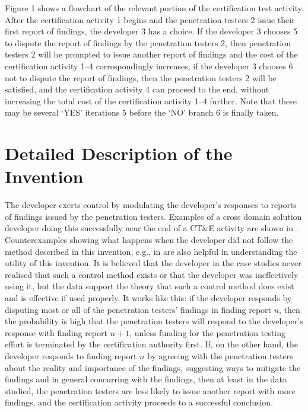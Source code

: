 \documentclass[12pt,letterpaper]{article}
\begin{document}
Figure 1 shows a flowchart of the relevant portion of the certification test activity.  After
the certification activity 1 begins and the penetration testers 2 issue their first report of
findings, the developer 3 has a choice.  If the developer 3 chooses 5 to dispute the report of
findings by the penetration testers 2, then penetration testers 2 will be prompted to issue
another report of findings and the cost of the certification activity 1--4 correspondingly
increases; if the developer 3 chooses 6 not to dispute the report of findings, then the
penetration testers 2 will be satisfied, and the certification activity 4 can proceed to the
end, without increasing the total cost of the certification activity 1--4 further.  Note that
there may be several `YES' iterations 5 before the `NO' branch 6 is finally taken.

\section{Detailed Description of the Invention}

The developer exerts control by modulating the developer's responses to reports of findings
issued by the penetration testers.  Examples of a cross domain solution developer doing
this successfully near the end of a CT\&E activity are shown in \cite[Chapter 4]{Loughry2012b}.
Counterexamples showing what happens when the developer did not follow the method described
in this invention, e.g., in \cite[Chapter 5]{Loughry2012b} are also helpful in understanding
the utility of this invention.  It is believed that the developer in the case studies never
realised that such a control method exists or that the developer was
ineffectively using it, but the data support the theory that such a control method does exist
and is effective if used properly.  It works like this: if the developer responds by disputing
most or all of the penetration testers' findings in finding report $n$, then the probability
is high that the penetration testers will respond to the developer's response with finding
report $n+1$, unless funding for the penetration testing effort is terminated by the
certification authority first.  If, on the other hand, the developer responds to finding
report $n$ by agreeing with the penetration testers about the reality and importance of the
findings, suggesting ways to mitigate the findings and in general concurring with the findings,
then at least in the data studied, the penetration testers are less likely to issue another
report with more findings, and the certification activity proceeds to a successful conclusion.
\end{document}
